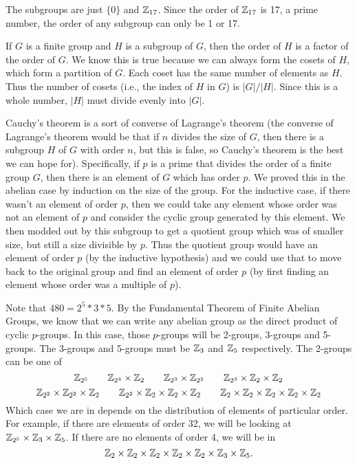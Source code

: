 \documentclass[10pt]{exam}
\renewenvironment{Ans}[1]{\setcounter{question}{#1}\addtocounter{question}{-1}\question }{}
\begin{document}
\begin{questions}
\begin{Ans}{7}
  
\end{Ans}
\begin{Ans}{8}
   The subgroups are just $\{0\}$ and $\mathbb Z_{17}$.  Since the order of $\mathbb Z_{17}$ is 17, a prime number, the order of any subgroup can only be 1 or 17.
  
\end{Ans}
\begin{Ans}{9}
 If $G$ is a finite group and $H$ is a subgroup of $G$, then the order of $H$ is a factor of the order of $G$.  We know this is true because we can always form the cosets of $H$, which form a partition of $G$. Each coset has the same number of elements as $H$.  Thus the number of cosets (i.e., the index of $H$ in $G$) is $|G|/|H|$.  Since this is a whole number, $|H|$ must divide evenly into $|G|$.
\end{Ans}
\begin{Ans}{10}
Cauchy's theorem is a sort of converse of Lagrange's theorem (the converse of Lagrange's theorem would be that if $n$ divides the size of $G$, then there is a subgroup $H$ of $G$ with order $n$, but this is false, so Cauchy's theorem is the best we can hope for).  Specifically, if $p$ is a prime that divides the order of a finite group $G$, then there is an element of $G$ which has order $p$.  We proved this in the abelian case by induction on the size of the group.  For the inductive case, if there wasn't an element of order $p$, then we could take any element whose order was not an element of $p$ and consider the cyclic group generated by this element.  We then modded out by this subgroup to get a quotient group which was of smaller size, but still a size divisible by $p$.  Thus the quotient group would have an element of order $p$ (by the inductive hypothesis) and we could use that to move back to the original group and find an element of order $p$ (by first finding an element whose order was a multiple of $p$).
\end{Ans}
\begin{Ans}{11}
Note that $480 = 2^5 * 3 * 5$.  By the Fundamental Theorem of Finite Abelian Groups, we know that we can write any abelian group as the direct product of cyclic $p$-groups.  In this case, those $p$-groups will be 2-groups, 3-groups and 5-groups.  The 3-groups and 5-groups must be $\mathbb Z_3$ and $\mathbb Z_5$ respectively.  The $2$-groups can be one of
\[\mathbb Z_{2^5} \qquad \mathbb Z_{2^4}\times \mathbb Z_2 \qquad \mathbb Z_{2^3}\times \mathbb Z_{2^2} \qquad \mathbb Z_{2^3} \times \mathbb Z_{2}\times\mathbb Z_2\]
\[\mathbb Z_{2^2}\times \mathbb Z_{2^2}\times \mathbb Z_2 \qquad \mathbb Z_{2^2} \times\mathbb Z_2\times \mathbb Z_2\times\mathbb Z_2 \qquad \mathbb Z_2\times\mathbb Z_2\times\mathbb Z_2\times\mathbb Z_2\times\mathbb Z_2\]
Which case we are in depends on the distribution of elements of particular order.  For example, if there are elements of order 32, we will be looking at $\mathbb Z_{2^5}\times\mathbb Z_3\times\mathbb Z_5$.  If there are no elements of order 4, we will be in
\[\mathbb Z_2\times\mathbb Z_2\times\mathbb Z_2\times \mathbb Z_2\times\mathbb Z_2\times \mathbb Z_3\times\mathbb Z_5.\]
\end{Ans}
\begin{Ans}{12}
		\begin{parts}

\end{parts}
\end{Ans}
\end{questions}
\end{document}
